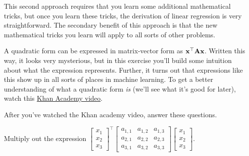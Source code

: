 \documentclass[assignment02_Solutions]{subfiles}
\begin{document}
This second approach requires that you learn some additional mathematical tricks, but once you learn these tricks, the derivation of linear regression is very straightforward.  The secondary benefit of this approach is that the new mathematical tricks you learn will apply to all sorts of other problems.

\begin{exercise}[(15 minutes)]
A quadratic form can be expressed in matrix-vector form as $\mathbf{x}^\top \mathbf{A} \mathbf{x}$.  Written this way, it looks very mysterious, but in this exercise you'll build some intuition about what the expression represents. Further, it turns out that expressions like this show up in all sorts of places in machine learning.   To get a better understanding of what a quadratic form \emph{is} (we'll see what it's good for later), watch this \href{https://www.khanacademy.org/math/multivariable-calculus/applications-of-multivariable-derivatives/quadratic-approximations/v/expressing-a-quadratic-form-with-a-matrix}{Khan Academy video}.

After you've watched the Khan academy video, answer these questions.

\bes
\item Multiply out the expression $\begin{bmatrix} x_1 \\ x_2 \\ x_3 \end{bmatrix}^\top \begin{bmatrix} a_{1,1} & a_{1,2} & a_{1,3} \\ a_{2,1} & a_{2,2} & a_{2,3} \\ a_{3,1} & a_{3,2} & a_{3,3} \end{bmatrix}\begin{bmatrix} x_1 \\ x_2 \\ x_3 \end{bmatrix}$.


\end{exercise}
\end{document}
